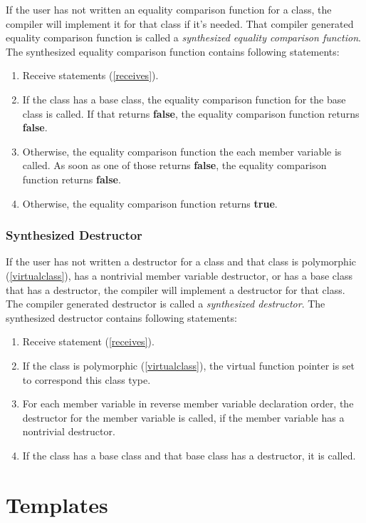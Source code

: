 \documentclass[a4paper,oneside,11pt]{book}
\theoremstyle{definition}
\begin{document}
If the user has not written an equality comparison function for a class, the compiler will implement it for that class if it's needed.
That compiler generated equality comparison function is called a \emph{synthesized equality comparison function}.
The synthesized equality comparison function contains following statements:
\begin{enumerate}
\item
Receive statements (\ref{receives}).
\item
If the class has a base class, the equality comparison function for the base class is called.
If that returns \textbf{false}, the equality comparison function returns \textbf{false}.
\item
Otherwise, the equality comparison function the each member variable is called. As soon as one of those returns \textbf{false},
the equality comparison function returns \textbf{false}.
\item
Otherwise, the equality comparison function returns \textbf{true}.
\end{enumerate}

\subsection{Synthesized Destructor}

If the user has not written a destructor for a class and that class is polymorphic (\ref{virtualclass}), has a nontrivial member variable destructor,
or has a base class that has a destructor, the compiler will implement a destructor for that class.
The compiler generated destructor is called a \emph{synthesized destructor}.
The synthesized destructor contains following statements:
\begin{enumerate}
\item
Receive statement (\ref{receives}).
\item
If the class is polymorphic (\ref{virtualclass}), the virtual function pointer is set to correspond this class type.
\item
For each member variable in reverse member variable declaration order, the destructor for the member variable is called,
if the member variable has a nontrivial destructor.
\item
If the class has a base class and that base class has a destructor, it is called.
\end{enumerate}

\chapter{Templates}
\end{document}
